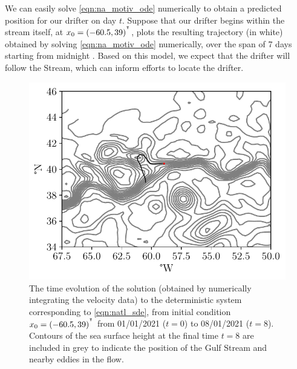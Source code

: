 We can easily solve \cref{eqn:na_motiv_ode} numerically to obtain a predicted position for our drifter on day \(t\).
Suppose that our drifter begins within the stream itself, at \(x_0 = \left(-60.5, 39\right)^{^{\intercal}}\),  plots the resulting trajectory (in white) obtained by solving \cref{eqn:na_motiv_ode} numerically, over the span of 7 days starting from midnight .
Based on this model, we expect that the drifter will follow the Stream, which can inform efforts to locate the drifter.

\begin{figure}
	\begin{center}
		\includegraphics[width=\textwidth]{chp06_applications/figures/gulf_stream_motivation/det_traj.pdf}
		\caption{The time evolution of the solution (obtained by numerically integrating the velocity data) to the deterministic system corresponding to \cref{eqn:natl_sde}, from initial condition \(x_0 = \left(-60.5, 39\right)^{^{\intercal}}\) from 01/01/2021 (\(t = 0\)) to 08/01/2021 (\(t = 8\)).
			Contours of the sea surface height at the final time \(t = 8\) are included in grey to indicate the position of the Gulf Stream and nearby eddies in the flow.}
		\label{fig:na_motiv_det}
	\end{center}
\end{figure}

